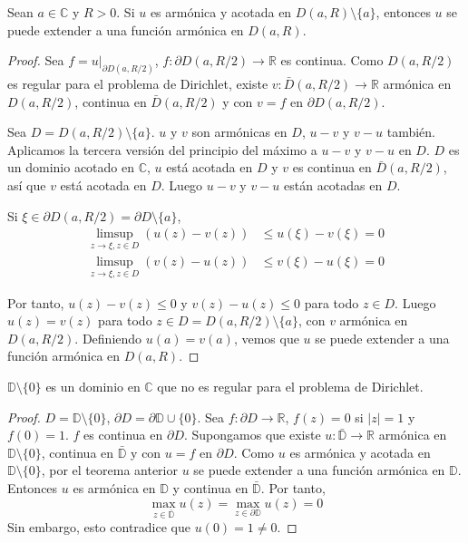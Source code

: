 \begin{theorem}
    Sean $a \in \mathbb{C}$ y $R > 0$.
    Si $u$ es armónica y acotada en $D(a, R) \setminus \{a\}$, entonces $u$ se puede extender a una función armónica en $D(a, R)$.
\end{theorem}

\begin{proof}
    Sea $f = u|_{\partial D(a, R/2)}$, $f: \partial D(a, R/2) \to \mathbb{R}$ es continua.
    Como $D(a, R/2)$ es regular para el problema de Dirichlet, existe $v: \bar{D}(a, R/2) \to \mathbb{R}$ armónica en $D(a, R/2)$, continua en $\bar{D}(a, R/2)$ y con $v = f$ en $\partial D(a, R/2)$.

    Sea $D = D(a, R/2) \setminus \{a\}$.
    $u$ y $v$ son armónicas en $D$, $u-v$ y $v-u$ también.
    Aplicamos la tercera versión del principio del máximo a $u-v$ y $v-u$ en $D$.
    $D$ es un dominio acotado en $\mathbb{C}$, $u$ está acotada en $D$ y $v$ es continua en $\bar{D}(a, R/2)$, así que $v$ está acotada en $D$.
    Luego $u-v$ y $v-u$ están acotadas en $D$.

    Si $\xi \in \partial D(a, R/2) = \partial D \setminus \{a\}$,
    \begin{align*}
        \limsup_{z \to \xi, z \in D} (u(z) - v(z)) & \leq u(\xi) - v(\xi) = 0 \\
        \limsup_{z \to \xi, z \in D} (v(z) - u(z)) & \leq v(\xi) - u(\xi) = 0
    \end{align*}

    Por tanto, $u(z) - v(z) \leq 0$ y $v(z) - u(z) \leq 0$ para todo $z \in D$.
    Luego $u(z) = v(z)$ para todo $z \in D = D(a, R/2) \setminus \{a\}$, con $v$ armónica en $D(a, R/2)$.
    Definiendo $u(a) = v(a)$, vemos que $u$ se puede extender a una función armónica en $D(a, R)$.
\end{proof}

\begin{theorem}
    $\mathbb{D} \setminus \{0\}$ es un dominio en $\mathbb{C}$ que no es regular para el problema de Dirichlet.
\end{theorem}

\begin{proof}
    $D = \mathbb{D} \setminus \{0\}$, $\partial D = \partial\mathbb{D} \cup \{0\}$.
    Sea $f: \partial D \to \mathbb{R}$, $f(z) = 0$ si $|z| = 1$ y $f(0) = 1$.
    $f$ es continua en $\partial D$.
    Supongamos que existe $u: \bar{\mathbb{D}} \to \mathbb{R}$ armónica en $\mathbb{D} \setminus \{0\}$, continua en $\bar{\mathbb{D}}$ y con $u = f$ en $\partial D$.
    Como $u$ es armónica y acotada en $\mathbb{D} \setminus \{0\}$, por el teorema anterior $u$ se puede extender a una función armónica en $\mathbb{D}$.
    Entonces $u$ es armónica en $\mathbb{D}$ y continua en $\bar{\mathbb{D}}$.
    Por tanto,
    $$\max_{z \in \bar{\mathbb{D}}} u(z) = \max_{z \in \partial\mathbb{D}} u(z) = 0$$
    Sin embargo, esto contradice que $u(0) = 1 \neq 0$.
\end{proof}


